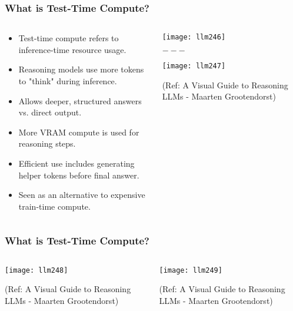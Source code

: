 \begin{frame}[fragile]\frametitle{What is Test-Time Compute?}
\begin{columns}
    \begin{column}[T]{0.5\linewidth}
      \begin{itemize}
        \item Test-time compute refers to inference-time resource usage.
        \item Reasoning models use more tokens to "think" during inference.
        \item Allows deeper, structured answers vs. direct output.
        \item More VRAM compute is used for reasoning steps.
        \item Efficient use includes generating helper tokens before final answer.
        \item Seen as an alternative to expensive train-time compute.
      \end{itemize}
    \end{column}
    \begin{column}[T]{0.5\linewidth}
        \begin{center}
        \texttt{[image: llm246]}
		
		$---$
		
        \texttt{[image: llm247]}
		
		{\tiny (Ref: A Visual Guide to Reasoning LLMs - Maarten Grootendorst)}
		
        \end{center}    
    \end{column}
  \end{columns}
\end{frame}

\begin{frame}[fragile]\frametitle{What is Test-Time Compute?}
\begin{columns}
    \begin{column}[T]{0.5\linewidth}
        \begin{center}
        \texttt{[image: llm248]}
		
		{\tiny (Ref: A Visual Guide to Reasoning LLMs - Maarten Grootendorst)}
		
        \end{center}  
    \end{column}
    \begin{column}[T]{0.5\linewidth}
        \begin{center}
        \texttt{[image: llm249]}
		
		{\tiny (Ref: A Visual Guide to Reasoning LLMs - Maarten Grootendorst)}
		
        \end{center}    
    \end{column}
  \end{columns}
\end{frame}


